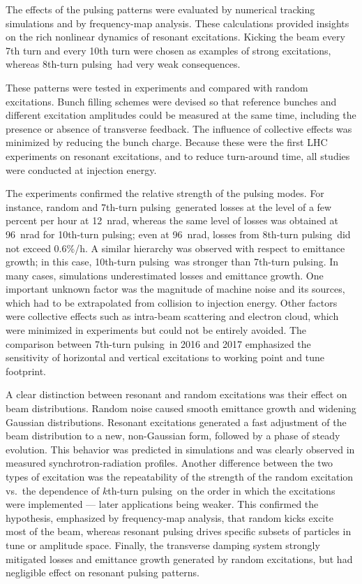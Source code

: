 \documentclass[aps
,prstab
,reprint
,longbibliography
,preprintnumbers
,showkeys
,amsfonts,amssymb,amsmath
,floatfix
]{revtex4-1}
\newcommand{\kthtp}{$k$th-turn pulsing}
\newcommand{\seventhtp}{7th-turn pulsing}
\newcommand{\eighthtp}{8th-turn pulsing}
\newcommand{\tenthtp}{10th-turn pulsing}
\begin{document}
The effects of the pulsing patterns were evaluated by numerical
tracking simulations and by frequency-map analysis. These calculations
provided insights on the rich nonlinear dynamics of resonant
excitations. Kicking the beam every 7th turn and every 10th turn were
chosen as examples of strong excitations, whereas \eighthtp\ had very
weak consequences.

These patterns were tested in experiments and compared with random
excitations. Bunch filling schemes were devised so that reference
bunches and different excitation amplitudes could be measured at the
same time, including the presence or absence of transverse
feedback. The influence of collective effects was minimized by
reducing the bunch charge. Because these were the first LHC
experiments on resonant excitations, and to reduce turn-around time,
all studies were conducted at injection energy.

The experiments confirmed the relative strength of the pulsing
modes. For instance, random and \seventhtp\ generated losses at the
level of a few percent per hour at 12~nrad, whereas the same level of
losses was obtained at 96~nrad for \tenthtp; even at 96~nrad, losses
from \eighthtp\ did not exceed 0.6\%/h. A similar hierarchy was
observed with respect to emittance growth; in this case, \tenthtp\ was
stronger than \seventhtp. In many cases, simulations underestimated
losses and emittance growth. One important unknown factor was the
magnitude of machine noise and its sources, which had to be
extrapolated from collision to injection energy. Other factors were
collective effects such as intra-beam scattering and electron cloud,
which were minimized in experiments but could not be entirely
avoided. The comparison between \seventhtp\ in 2016 and 2017
emphasized the sensitivity of horizontal and vertical excitations to
working point and tune footprint.

A clear distinction between resonant and random excitations was their
effect on beam distributions. Random noise caused smooth emittance
growth and widening Gaussian distributions. Resonant excitations
generated a fast adjustment of the beam distribution to a new,
non-Gaussian form, followed by a phase of steady evolution. This
behavior was predicted in simulations and was clearly observed in
measured synchrotron-radiation profiles. Another difference between
the two types of excitation was the repeatability of the strength of
the random excitation vs.\ the dependence of \kthtp\ on the order in
which the excitations were implemented --- later applications being
weaker. This confirmed the hypothesis, emphasized by frequency-map
analysis, that random kicks excite most of the beam, whereas resonant
pulsing drives specific subsets of particles in tune or amplitude
space. Finally, the transverse damping system strongly mitigated
losses and emittance growth generated by random excitations, but had
negligible effect on resonant pulsing patterns.
\end{document}
